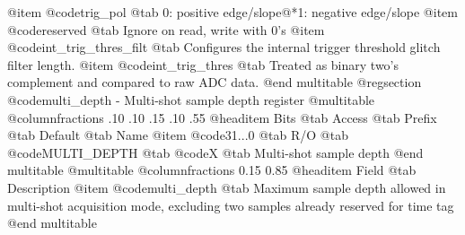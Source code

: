 @item @code{trig_pol} @tab 0: positive edge/slope@*1: negative edge/slope
@item @code{reserved} @tab Ignore on read, write with 0's
@item @code{int_trig_thres_filt} @tab Configures the internal trigger threshold glitch filter length.
@item @code{int_trig_thres} @tab Treated as binary two's complement and compared to raw ADC data.
@end multitable
@regsection @code{multi_depth} - Multi-shot sample depth register
@multitable @columnfractions .10 .10 .15 .10 .55
@headitem Bits @tab Access @tab Prefix @tab Default @tab Name
@item @code{31...0}
@tab R/O @tab
@code{MULTI_DEPTH}
@tab @code{X} @tab 
Multi-shot sample depth
@end multitable
@multitable @columnfractions 0.15 0.85
@headitem Field @tab Description
@item @code{multi_depth} @tab Maximum sample depth allowed in multi-shot acquisition mode, excluding two samples already reserved for time tag
@end multitable
